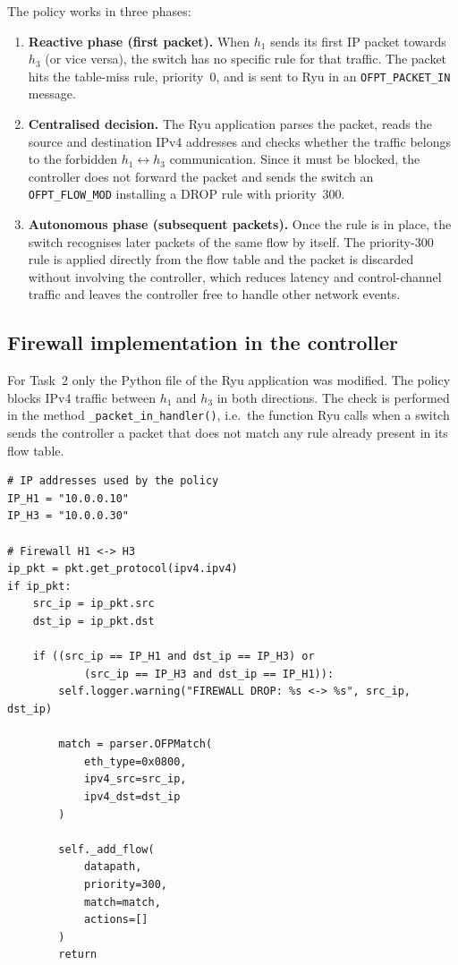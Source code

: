 \documentclass[11pt,a4paper]{article}
\newcommand{\code}[1]{\texttt{#1}}
\begin{document}
The policy works in three phases:
\begin{enumerate}
  \item \textbf{Reactive phase (first packet).} When $h_1$ sends its first IP
        packet towards $h_3$ (or vice versa), the switch has no specific rule
        for that traffic. The packet hits the table-miss rule, priority~0, and
        is sent to Ryu in an \code{OFPT\_PACKET\_IN} message.
  \item \textbf{Centralised decision.} The Ryu application parses the packet,
        reads the source and destination IPv4 addresses and checks whether the
        traffic belongs to the forbidden $h_1\leftrightarrow h_3$ communication.
        Since it must be blocked, the controller does not forward the packet and
        sends the switch an \code{OFPT\_FLOW\_MOD} installing a DROP rule with
        priority~300.
  \item \textbf{Autonomous phase (subsequent packets).} Once the rule is in
        place, the switch recognises later packets of the same flow by itself.
        The priority-300 rule is applied directly from the flow table and the
        packet is discarded without involving the controller, which reduces
        latency and control-channel traffic and leaves the controller free to
        handle other network events.
\end{enumerate}

\subsection{Firewall implementation in the controller}
For Task~2 only the Python file of the Ryu application was modified. The policy
blocks IPv4 traffic between $h_1$ and $h_3$ in both directions. The check is
performed in the method \code{\_packet\_in\_handler()}, i.e.\ the function Ryu
calls when a switch sends the controller a packet that does not match any rule
already present in its flow table.

\begin{lstlisting}[style=py,caption={Firewall block of Task 2}]
# IP addresses used by the policy
IP_H1 = "10.0.0.10"
IP_H3 = "10.0.0.30"

# Firewall H1 <-> H3
ip_pkt = pkt.get_protocol(ipv4.ipv4)
if ip_pkt:
    src_ip = ip_pkt.src
    dst_ip = ip_pkt.dst

    if ((src_ip == IP_H1 and dst_ip == IP_H3) or
            (src_ip == IP_H3 and dst_ip == IP_H1)):
        self.logger.warning("FIREWALL DROP: %s <-> %s", src_ip, dst_ip)

        match = parser.OFPMatch(
            eth_type=0x0800,
            ipv4_src=src_ip,
            ipv4_dst=dst_ip
        )

        self._add_flow(
            datapath,
            priority=300,
            match=match,
            actions=[]
        )
        return
\end{lstlisting}
\end{document}
